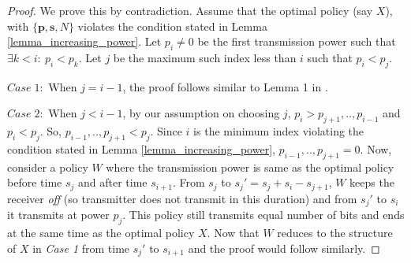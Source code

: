 \begin{proof}

We prove this by contradiction. Assume that the optimal policy (say $X$), with $\{\bm{p},\bm{s},N\}$ violates the condition stated in Lemma \ref{lemma_increasing_power}. Let $p_i\neq 0$ be the first transmission power such that $\exists k<i:\ p_i<p_k $. Let $j$ be the maximum such index less than $i$ such that $p_i<p_j$. 

%

$Case\;1:$ When $j=i-1$, the proof follows similar to Lemma 1 in \cite{Yang}.

$Case\;2:$ When $j<i-1$, by our assumption on choosing $j$, $p_i>p_{j+1},..,p_{i-1}$ and $p_i<p_{j}$. So, $p_{i-1},..,p_{j+1}<p_j$. Since $i$ is the  minimum index violating the condition stated in Lemma \ref{lemma_increasing_power}, $p_{i-1},..,p_{j+1}=0$. Now, consider a policy $W$ where the transmission power is same as the optimal policy before time $s_j$ and after time $s_{i+1}$. From $s_j$ to $s_j'=s_j+s_{i}-s_{j+1}$, $W$ keeps the receiver \textit{off} (so transmitter does not transmit in this duration) and from $s_j'$ to $s_{i}$ it transmits at power $p_j$. This policy still transmits equal number of bits and ends at the same time as the optimal policy $X$. Now that $W$ reduces to the structure of $X$ in \textit{Case 1} from time $s_j'$ to $s_{i+1}$ and the proof would follow similarly.




\end{proof}
